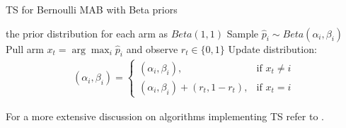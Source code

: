 \begin{algorithm}[t]
	\caption{\gls{TS} for Bernoulli MAB with Beta priors}
	\label{alg:bernoulliTS}
	\begin{algorithmic}[1]
	 the prior distribution for each arm as $Beta(1,1)$
			\State Sample $\hat{p}_i\sim Beta(\alpha_i,\beta_i)$
		\EndFor
		\State Pull arm $x_t=\arg\max_i\hat{p}_i$ and observe $r_t\in\{0,1\}$
		\State Update distribution:
		\begin{align}
			(\alpha_i,\beta_i) = \begin{cases}(\alpha_i,\beta_i), &\text{if }x_t\neq i \\ (\alpha_i,\beta_i) + (r_t,1-r_t), &\text{if } x_t= i\end{cases}
		\end{align}
	\EndFor
	\end{algorithmic}
\end{algorithm}

For a more extensive discussion on algorithms implementing \gls{TS}  refer to \cite{russo2018tutorial}.
\\


